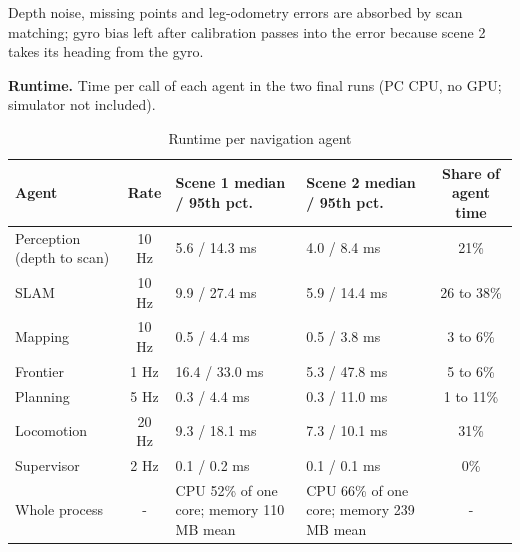\documentclass[11pt, a4paper]{article}
\begin{document}
\noindent
Depth noise, missing points and leg-odometry errors are absorbed by scan matching; gyro bias left after calibration passes into the error because scene 2 takes its heading from the gyro.

\noindent
\textbf{Runtime.} Time per call of each agent in the two final runs (PC CPU, no GPU; simulator not included).

\begin{table}[H]
    \centering
    \footnotesize
    \renewcommand{\arraystretch}{1.2}
    \begin{tabular}{|p{3.4cm}|c|p{3.6cm}|p{3.6cm}|c|}
        \hline
        \textbf{Agent} & \textbf{Rate} & \textbf{Scene 1 median / 95th pct.} & \textbf{Scene 2 median / 95th pct.} & \textbf{Share of agent time} \\
        \hline
        Perception (depth to scan) & 10 Hz & 5.6 / 14.3 ms & 4.0 / 8.4 ms & 21\% \\
        \hline
        SLAM & 10 Hz & 9.9 / 27.4 ms & 5.9 / 14.4 ms & 26 to 38\% \\
        \hline
        Mapping & 10 Hz & 0.5 / 4.4 ms & 0.5 / 3.8 ms & 3 to 6\% \\
        \hline
        Frontier & 1 Hz & 16.4 / 33.0 ms & 5.3 / 47.8 ms & 5 to 6\% \\
        \hline
        Planning & 5 Hz & 0.3 / 4.4 ms & 0.3 / 11.0 ms & 1 to 11\% \\
        \hline
        Locomotion & 20 Hz & 9.3 / 18.1 ms & 7.3 / 10.1 ms & 31\% \\
        \hline
        Supervisor & 2 Hz & 0.1 / 0.2 ms & 0.1 / 0.1 ms & 0\% \\
        \hline
        Whole process & - & CPU 52\% of one core; memory 110 MB mean & CPU 66\% of one core; memory 239 MB mean & - \\
        \hline
    \end{tabular}
    \caption{Runtime per navigation agent}
\end{table}
\end{document}
